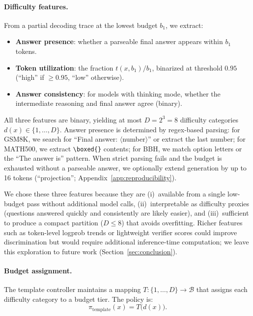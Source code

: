 \paragraph{Difficulty features.}
From a partial decoding trace at the lowest budget $b_1$, we extract:
\begin{itemize}[nosep,leftmargin=*]
    \item \textbf{Answer presence}: whether a parseable final answer appears within $b_1$ tokens.
    \item \textbf{Token utilization}: the fraction $t(x, b_1) / b_1$, binarized at threshold $0.95$ (``high'' if $\geq 0.95$, ``low'' otherwise).
    \item \textbf{Answer consistency}: for models with thinking mode, whether the intermediate reasoning and final answer agree (binary).
\end{itemize}
All three features are binary, yielding at most $D = 2^3 = 8$ difficulty categories $d(x) \in \{1, \ldots, D\}$.
Answer presence is determined by regex-based parsing: for GSM8K, we search for ``Final answer: $\langle$number$\rangle$'' or extract the last number; for MATH500, we extract \texttt{\textbackslash boxed\{\}} contents; for BBH, we match option letters or the ``The answer is'' pattern.
When strict parsing fails and the budget is exhausted without a parseable answer, we optionally extend generation by up to 16 tokens (``projection''; Appendix~\ref{app:reproducibility}).

We chose these three features because they are (i)~available from a single low-budget pass without additional model calls, (ii)~interpretable as difficulty proxies (questions answered quickly and consistently are likely easier), and (iii)~sufficient to produce a compact partition ($D \leq 8$) that avoids overfitting.
Richer features such as token-level logprob trends or lightweight verifier scores could improve discrimination but would require additional inference-time computation; we leave this exploration to future work (Section~\ref{sec:conclusion}).

\paragraph{Budget assignment.}
The template controller maintains a mapping $T: \{1, \ldots, D\} \to \mathcal{B}$ that assigns each difficulty category to a budget tier.
The policy is:
\begin{equation}
    \pi_\text{template}(x) = T\big(d(x)\big).
\end{equation}

